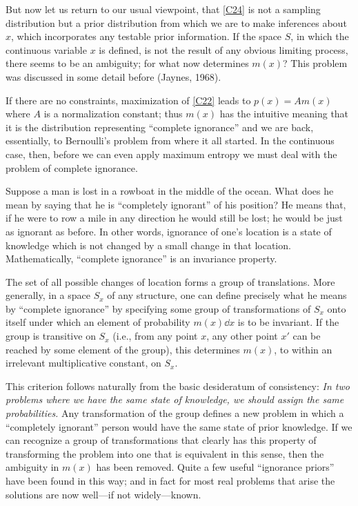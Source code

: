 {But now let us return to our usual viewpoint, that \eqref{C24} is not a sampling distribution but a prior distribution from which we are to make inferences about $x$, which incorporates any testable prior information.
If the space $S$, in which the continuous variable $x$ is defined, is not the result of any obvious limiting process, there seems to be an ambiguity; for what now determines $m(x)$?
This problem was discussed in some detail before (Jaynes, \cite{jaynes68}{1968}).

If there are no constraints, maximization of \eqref{C22} leads to $p(x) = A m(x)$ where $A$ is a normalization constant; thus $m(x)$ has the intuitive meaning that it is the distribution representing ``complete ignorance'' and we are back, essentially, to Bernoulli's problem from where it all started.
In the continuous case, then, before we can even apply maximum entropy we must deal with the problem of complete ignorance.

Suppose a man is lost in a rowboat in the middle of the ocean.
What does he mean by saying that he is ``completely ignorant'' of his position?
He means that, if he were to row a mile in any direction he would still be lost; he would be just as ignorant as before.
In other words, ignorance of one's location is a state of knowledge which is not changed by a small change in that location.
Mathematically, ``complete ignorance'' is an invariance property.

The set of all possible changes of location forms a group of translations.
More generally, in a space $S_x$ of any structure, one can define precisely what he means by ``complete ignorance'' by specifying some group of transformations of $S_x$ onto itself under which an element of probability $m(x)\dd x$ is to be invariant.
If the group is transitive on $S_x$ (i.e., from any point $x$, any other point $x'$ can be reached by some element of the group), this determines $m(x)$, to within an irrelevant multiplicative constant, on $S_x$.

This criterion follows naturally from the basic desideratum of consistency: \emph{In two problems where we have the same state of knowledge, we should assign the same probabilities.}
Any transformation of the group defines a new problem in which a ``completely ignorant'' person would have the same state of prior knowledge.
If we can recognize a group of transformations that clearly has this property of transforming the problem into one that is equivalent in this sense, then the ambiguity in $m(x)$ has been removed.
Quite a few useful ``ignorance priors'' have been found in this way; and in fact for most real problems that arise the solutions are now well---if not widely---known.

}
